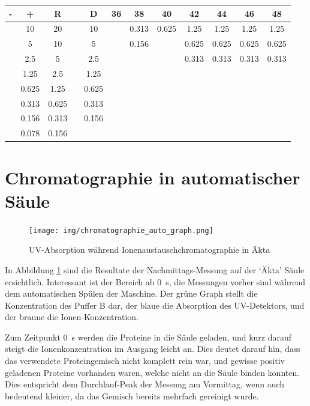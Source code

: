 \documentclass[a4paper,german]{scrreprt}
\begin{document}
\begin{tabu}{cccccccccccc}
	\toprule
	- & +      & R      & & D      & 36 & 38    & 40    & 42     & 44    & 46    & 48    \\
	\midrule
	  & 10     & 20     & & 10     &    & 0.313 & 0.625 & 1.25   & 1.25  & 1.25  & 1.25  \\ 
	  &  5     & 10     & &  5     &    & 0.156 &       & 0.625  & 0.625 & 0.625 & 0.625 \\ 
	  &  2.5   &  5     & &  2.5   &    &       &       & 0.313  & 0.313 & 0.313 & 0.313 \\ 
	  &  1.25  &  2.5   & &  1.25  &    &       &       &        &       &       &       \\ 
	  &  0.625 &  1.25  & &  0.625 &    &       &       &        &       &       &       \\ 
	  &  0.313 &  0.625 & &  0.313 &    &       &       &        &       &       &       \\ 
	  &  0.156 &  0.313 & &  0.156 &    &       &       &        &       &       &       \\ 
	  &  0.078 &  0.156 & &        &    &       &       &        &       &       &       \\ 
	\bottomrule
\end{tabu}

\section{Chromatographie in automatischer Säule} 

\begin{figure}[h]
	\centering
	\texttt{[image: img/chromatographie\_auto\_graph.png]}
	\caption{UV-Absorption während Ionenaustauschchromatographie in Äkta}
	\label{fig:chrom_graph_auto}
\end{figure}

In Abbildung \ref{fig:chrom_graph_auto} sind die Resultate der
Nachmittags-Messung auf der `Äkta' Säule ersichtlich. Interessant ist der
Bereich ab \SI{0}{s}, die Messungen vorher sind während dem automatischen
Spülen der Maschine. Der grüne Graph stellt die Konzentration des Puffer B dar,
der blaue die Absorption des UV-Detektors, und der braune die Ionen-Konzentration.

Zum Zeitpunkt \SI{0}{s} werden die Proteine in die Säule geladen, und kurz
darauf steigt die Ionenkonzentration im Ausgang leicht an. Dies deutet darauf
hin, dass das verwendete Proteingemisch nicht komplett rein war, und
gewisse positiv geladenen Proteine vorhanden waren, welche nicht an die Säule
binden konnten. Dies entspricht dem Durchlauf-Peak der Messung am Vormittag,
wenn auch bedeutend kleiner, da das Gemisch bereits mehrfach gereinigt wurde.
\end{document}
